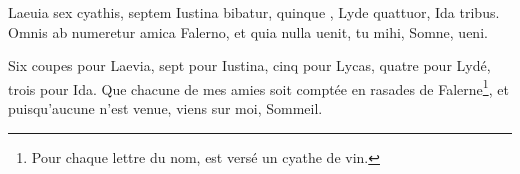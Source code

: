 \documentclass[12pt]{book} %
\begin{document}
\begin{alignment}
  \begin{edition}
          Laeuia sex cyathis, septem Iustina bibatur, 
          quinque , Lyde quattuor, Ida tribus. 
          Omnis ab 
          numeretur amica Falerno, 
          et quia nulla uenit, tu mihi, Somne, ueni.  
  \end{edition}
  \begin{translation}
          Six coupes pour Laevia, sept pour Iustina, 
          cinq pour Lycas, quatre pour Lydé, trois pour Ida. 
          Que chacune de mes amies soit comptée en rasades de Falerne\footnote{Pour chaque lettre du nom, est versé un cyathe de vin.}, 
          et puisqu'aucune n'est venue, viens sur moi, Sommeil.
  \end{translation}
\end{alignment}
  

\begin{alignment}
  \begin{edition}
  \end{edition}
  \begin{translation}
  \end{translation}
\end{alignment}

\end{document}
